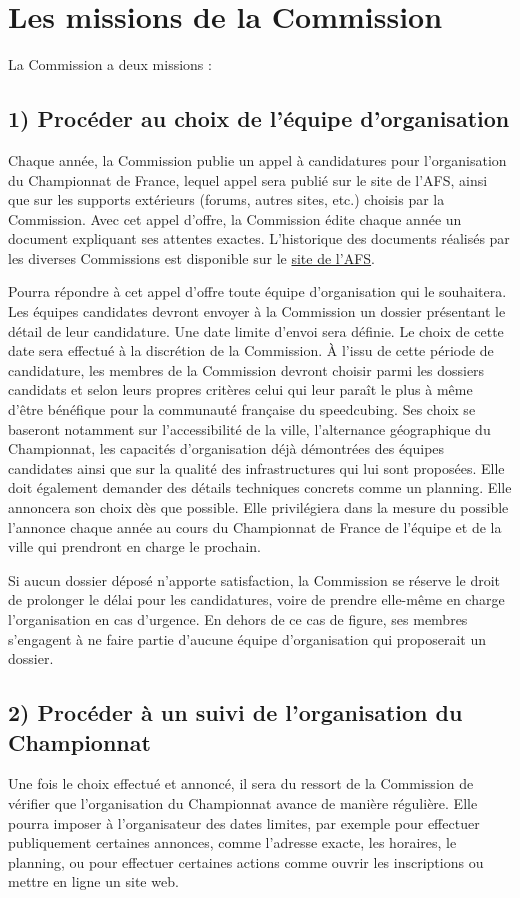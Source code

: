 \documentclass[a4paper,12pt]{scrartcl}
\begin{document}
\section*{Les missions de la Commission}
La Commission a deux missions :

\subsection*{1) Procéder au choix de l'équipe d'organisation}
Chaque année, la Commission publie un appel à candidatures pour l'organisation du Championnat de France, lequel appel sera publié sur le site de l'AFS, ainsi que sur les supports extérieurs (forums, autres sites, etc.) choisis par la Commission. Avec cet appel d'offre, la Commission édite chaque année un document expliquant ses attentes exactes. L'historique des documents réalisés par les diverses Commissions est disponible sur le \href{http://www.speedcubingfrance.org/speedcubing/cdf_historique/}{site de l'AFS}.

Pourra répondre à cet appel d'offre toute équipe d'organisation qui le souhaitera. Les équipes candidates devront envoyer à la Commission un dossier présentant le détail de leur candidature. Une date limite d'envoi sera définie. Le choix de cette date sera effectué à la discrétion de la Commission. À l'issu de cette période de candidature, les membres de la Commission devront choisir parmi les dossiers candidats et selon leurs propres critères celui qui leur paraît le plus à même d'être bénéfique pour la communauté française du speedcubing. Ses choix se baseront notamment sur l'accessibilité de la ville, l'alternance géographique du Championnat, les capacités d'organisation déjà démontrées des équipes candidates ainsi que sur la qualité des infrastructures qui lui sont proposées. Elle doit également demander des détails techniques concrets comme un planning. Elle annoncera son choix dès que possible. Elle privilégiera dans la mesure du possible l'annonce chaque année au cours du Championnat de France de l'équipe et de la ville qui prendront en charge le prochain.

Si aucun dossier déposé n'apporte satisfaction, la Commission se réserve le droit de prolonger le délai pour les candidatures, voire de prendre elle-même en charge l'organisation en cas d'urgence. En dehors de ce cas de figure, ses membres s'engagent à ne faire partie d'aucune équipe d'organisation qui proposerait un dossier.

\subsection*{2) Procéder à un suivi de l'organisation du Championnat}
Une fois le choix effectué et annoncé, il sera du ressort de la Commission de vérifier que l'organisation du Championnat avance de manière régulière. Elle pourra imposer à l'organisateur des dates limites, par exemple pour effectuer publiquement certaines annonces, comme l'adresse exacte, les horaires, le planning, ou pour effectuer certaines actions comme ouvrir les inscriptions ou mettre en ligne un site web.
\end{document}
